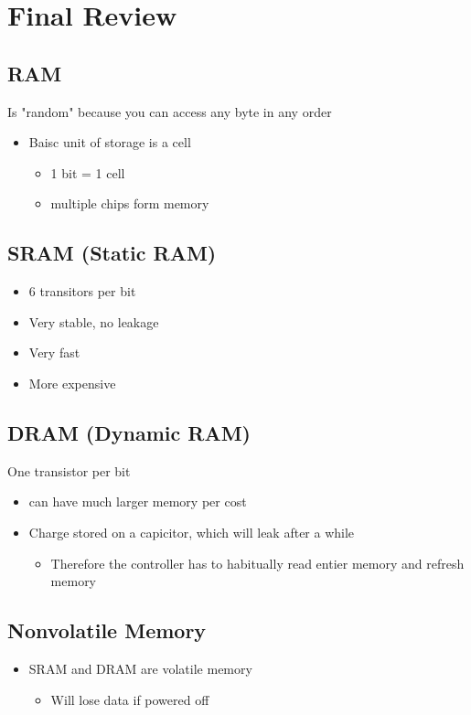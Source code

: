 \documentclass[11pt]{article}
\date{\today}
\title{}
\begin{document}
\tableofcontents

\section{Final Review}
\label{sec:orgheadline61}
\subsection{RAM}
\label{sec:orgheadline1}
Is "random" because you can access any byte in any order
\begin{itemize}
\item Baisc unit of storage is a cell
\begin{itemize}
\item 1 bit = 1 cell
\item multiple chips form memory
\end{itemize}
\end{itemize}
\subsection{SRAM (Static RAM)}
\label{sec:orgheadline2}
\begin{itemize}
\item 6 transitors per bit
\item Very stable, no leakage
\item Very fast
\item More expensive
\end{itemize}
\subsection{DRAM (Dynamic RAM)}
\label{sec:orgheadline3}
One transistor per bit
\begin{itemize}
\item can have much larger memory per cost
\item Charge stored on a capicitor, which will leak after a while
\begin{itemize}
\item Therefore the controller has to habitually read entier memory and refresh memory
\end{itemize}
\end{itemize}
\subsection{Nonvolatile Memory}
\label{sec:orgheadline6}
\begin{itemize}
\item SRAM and DRAM are volatile memory
\begin{itemize}
\item Will lose data if powered off
\end{itemize}
\end{itemize}
\end{document}
